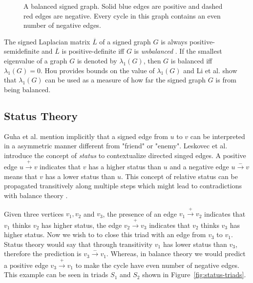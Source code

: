 \begin{figure}[!ht]
    \centering
    
    \caption{ A balanced signed graph. Solid blue edges are positive and dashed red edges are negative. Every cycle in this graph contains an even number of negative edges.}
    \label{fig:balanced-graph}
\end{figure}

The signed Laplacian matrix $\overline{L}$ of a signed graph $G$ is always positive-semidefinite and $\overline{L}$ is positive-definite iff $G$ is \textit{unbalanced} \cite{kunegis2010spectral,hou2005bounds,zaslavsky1982signed}. If the smallest eigenvalue of a graph $G$ is denoted by $\lambda_{1}(G)$, then $G$ is balanced iff $\lambda_{1}(G)=0$. Hou \cite{hou2005bounds} provides bounds on the value of $\lambda_{1}(G)$ and Li et al. \cite{li2016note} show that $\lambda_{1}(G)$ can be used as a measure of how far the signed graph $G$ is from being balanced.

\subsection{Status Theory}
\label{sec:status-theory}
Guha et al. \cite{guha2004propagation} mention implicitly that a signed edge from $u$ to $v$ can be interpreted in a asymmetric manner different from "friend" or "enemy". Leskovec et al. \cite{leskovec2010signed,leskovec2010predicting} introduce the concept of \textit{status} to contextualize directed singed edges. A positive edge $u \xrightarrow{+} v$ indicates that $v$ has a higher status than $u$ and a negative edge $u \xrightarrow{-} v$ means that $v$ has a lower status than $u$. This concept of relative status can be propagated transitively along multiple steps which might lead to contradictions with balance theory \cite{leskovec2010signed}.

Given three vertices $v_1,v_2$ and $v_3$, the presence of an edge $v_1 \xrightarrow{+} v_2$ indicates that $v_1$ thinks $v_2$ has higher status, the edge $v_2 \xrightarrow{+} v_3$ indicates that $v_2$ thinks $v_3$ has higher status. Now we wish to to close this triad with an edge from $v_3$ to $v_1$. Status theory would say that through transitivity $v_1$ has lower status than $v_3$, therefore the prediction is $v_3 \xrightarrow{-} v_1$. Whereas, in balance theory we would predict a positive edge $v_3 \xrightarrow{+} v_1$ to make the cycle have even number of negative edges. This example can be seen in triads $S_1$ and $S_2$ shown in Figure~\ref{fig:status-triads}.

